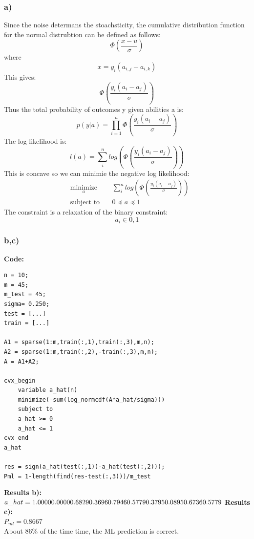 \documentclass[12pt]{article}
\begin{document}
\subsubsection*{a)}
Since the noise determans the stoachsticity, the cumulative distribution function for the normal distrubtion can be defined as follows:
$$\Phi(\frac{x-u}{\sigma})$$
where
$$x=y_i(a_{i,j}-a_{i,k})$$
This gives:
$$\Phi(\frac{y_i(a_i-a_j)}{\sigma})$$
Thus the total probability of outcomes y given abilities a is:
$$p(y|a)=\prod_{i=1}^{n}\Phi(\frac{y_i(a_i-a_j)}{\sigma})$$
The log likelihood is:
$$l(a) = \sum_{i}^{n}log(\Phi(\frac{y_i(a_i-a_j)}{\sigma}))$$
This is concave so we can minimie the negative log likelihood:
\begin{equation*}
\begin{aligned}
& \underset{a}{\text{minimize}}
& & \sum_{i}^{n}log(\Phi(\frac{y_i(a_i-a_j)}{\sigma}))\\
& \text{subject to}\
& & 0 \preceq a \preceq 1
\end{aligned}
\end{equation*}
The constraint is a relaxation of the binary constraint:
$$a_i \in {0,1}$$

\subsubsection*{b,c)}
\textbf{Code:}\\
\begin{lstlisting}
n = 10;
m = 45;
m_test = 45;
sigma= 0.250;
test = [...]
train = [...]

A1 = sparse(1:m,train(:,1),train(:,3),m,n);
A2 = sparse(1:m,train(:,2),-train(:,3),m,n);
A = A1+A2;

cvx_begin
    variable a_hat(n)
    minimize(-sum(log_normcdf(A*a_hat/sigma)))
    subject to
    a_hat >= 0
    a_hat <= 1
cvx_end
a_hat

res = sign(a_hat(test(:,1))-a_hat(test(:,2)));
Pml = 1-length(find(res-test(:,3)))/m_test
\end{lstlisting}
\textbf{Results b):}\\
$a\_hat =\\
    1.0000\\
    0.0000\\
    0.6829\\
    0.3696\\
    0.7946\\
    0.5779\\
    0.3795\\
    0.0895\\
    0.6736\\
    0.5779\\
$
\textbf{Results c):}\\
$P_{ml} = 0.8667$\\
About 86\% of the time time, the ML prediction is correct. 
\end{document}
